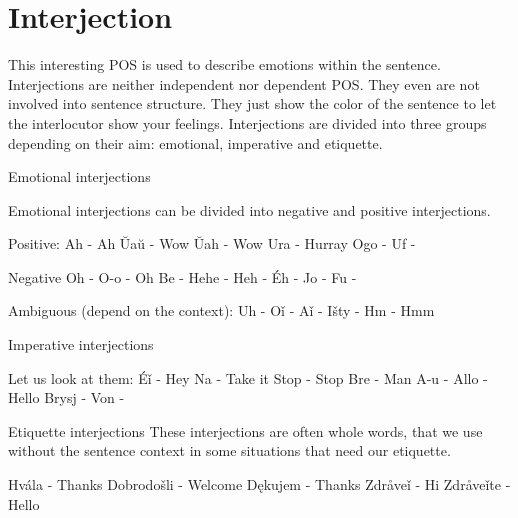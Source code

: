 \section{Interjection}

This interesting POS is used to describe emotions within the sentence. Interjections are neither independent nor dependent POS. They even are not involved into sentence structure. They just show the color of the sentence to let the interlocutor show your feelings. Interjections are divided into three groups depending on their aim: emotional, imperative and etiquette. 

Emotional interjections

Emotional interjections can be divided into negative and positive interjections.

Positive:
Ah - Ah
Ŭaŭ - Wow
Ŭah - Wow
Ura - Hurray
Ogo - 
Uf - 

Negative
Oh - 
O-o - Oh
Be - 
Hehe -
Heh -  
Éh - 
Jo - 
Fu - 

Ambiguous (depend on the context):
Uh - 
Oǐ - 
Aǐ - 
Išty - 
Hm - Hmm

Imperative interjections

Let us look at them:
Éǐ - Hey
Na - Take it
Stop - Stop
Bre - Man
A-u - 
Allo - Hello
Brysj - 
Von -

Etiquette interjections
These interjections are often whole words, that we use without the sentence context in some situations that need our etiquette.

Hvála - Thanks
Dobrodošli - Welcome
Dękujem - Thanks
Zdråveǐ - Hi
Zdråveǐte - Hello
